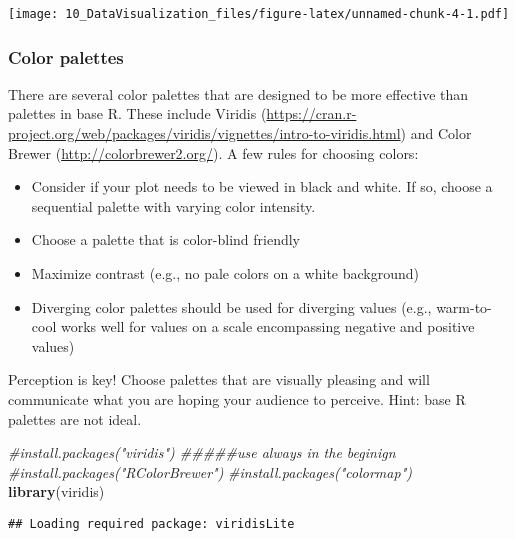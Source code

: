 \documentclass[]{article}
\newenvironment{Shaded}{\begin{snugshade}}{\end{snugshade}}
\newcommand{\KeywordTok}[1]{\textcolor[rgb]{0.13,0.29,0.53}{\textbf{#1}}}
\newcommand{\DataTypeTok}[1]{\textcolor[rgb]{0.13,0.29,0.53}{#1}}
\newcommand{\DecValTok}[1]{\textcolor[rgb]{0.00,0.00,0.81}{#1}}
\newcommand{\CommentTok}[1]{\textcolor[rgb]{0.56,0.35,0.01}{\textit{#1}}}
\newcommand{\OperatorTok}[1]{\textcolor[rgb]{0.81,0.36,0.00}{\textbf{#1}}}
\newcommand{\NormalTok}[1]{#1}
\providecommand{\tightlist}{%
  \setlength{\itemsep}{0pt}\setlength{\parskip}{0pt}}
\begin{document}
\texttt{[image: 10\_DataVisualization\_files/figure-latex/unnamed-chunk-4-1.pdf]}

\subsubsection{Color palettes}\label{color-palettes}

There are several color palettes that are designed to be more effective
than palettes in base R. These include Viridis
(\url{https://cran.r-project.org/web/packages/viridis/vignettes/intro-to-viridis.html})
and Color Brewer (\url{http://colorbrewer2.org/}). A few rules for
choosing colors:

\begin{itemize}
\tightlist
\item
  Consider if your plot needs to be viewed in black and white. If so,
  choose a sequential palette with varying color intensity.
\item
  Choose a palette that is color-blind friendly
\item
  Maximize contrast (e.g., no pale colors on a white background)
\item
  Diverging color palettes should be used for diverging values (e.g.,
  warm-to-cool works well for values on a scale encompassing negative
  and positive values)
\end{itemize}

Perception is key! Choose palettes that are visually pleasing and will
communicate what you are hoping your audience to perceive. Hint: base R
palettes are not ideal.

\begin{Shaded}
\begin{Highlighting}[]
\CommentTok{#install.packages("viridis")    #####use always in the beginign}
\CommentTok{#install.packages("RColorBrewer")}
\CommentTok{#install.packages("colormap")}
\KeywordTok{library}\NormalTok{(viridis)}
\end{Highlighting}
\end{Shaded}

\begin{verbatim}
## Loading required package: viridisLite
\end{verbatim}

\begin{Shaded}
\end{Shaded}
\end{document}
